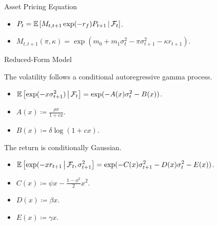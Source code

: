 \documentclass[smaller, aspectratio=169]{beamer}
\begin{document}
\begin{frame}[c]{Asset Pricing Equation}

    \begin{itemize}
        \item $\displaystyle P_t = \mathbb{E}\left[M_{t,t+1} \exp(-r_f) P_{t+1} \,\middle\vert\, \mathcal{F}_{t} \right]$.
            \bigskip
%
        \item $\displaystyle M_{t,t+1}(\pi, \kappa) = \exp\left(m_0 + m_1 \sigma^2_t - \pi \sigma^2_{t+1} - \kappa r_{t+1}\right)$.
    \end{itemize}

\end{frame}


\begin{frame}[c]{Reduced-Form Model}

    The volatility follows a conditional autoregressive gamma process.
%
    \medskip
    \begin{itemize}
        \item $\displaystyle \mathbb{E}\left[\exp(-x \sigma^2_{t+1}) \,\middle\vert\, \mathcal{F}_t\right] = \exp(-A(x) \sigma^2_{t} - B(x)) $.
        \medskip
%
        \item $\displaystyle A(x) \coloneqq \frac{\rho x}{1 + c x}$.
        \medskip
%
        \item $\displaystyle B(x) \coloneqq \delta \log(1 + c x)$.
    \end{itemize}
 
    \bigskip
    The return is conditionally Gaussian.
    \medskip

    \begin{itemize}
        \item $\displaystyle \mathbb{E}\left[\exp(-x r_{t+1} \,\middle\vert\, \mathcal{F}_t, \sigma^2_{t+1} \right] = \exp(-C(x) \sigma^2_{t+1} - D(x) \sigma^2_t - E(x))$.
        \medskip
%
        \item $\displaystyle  C(x) \coloneqq \psi x - \frac{1-\phi^2}{2} x^2 $.
        \medskip
%
        \item $\displaystyle D(x) \coloneqq \beta x$.
        \medskip
%
        \item $\displaystyle E(x) \coloneqq \gamma x$.  
%
    \end{itemize}
\end{frame}
\end{document}
